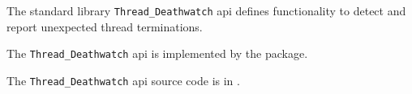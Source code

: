 
The standard library {\tt Thread\_Deathwatch} api defines functionality to detect and report unexpected thread terminations.

The {\tt Thread\_Deathwatch} api is implemented by the  package.

The {\tt Thread\_Deathwatch} api source code is in .






